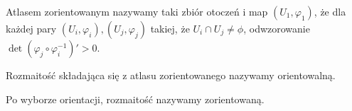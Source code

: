 \documentclass[../main.tex]{subfiles}
\begin{document}
\begin{definicja}
    Atlasem zorientowanym nazywamy taki zbiór otoczeń i map $(U_1, \varphi_1)$, że dla każdej pary $(U_i, \varphi_i), (U_j, \varphi_j)$ takiej, że $U_i\cap U_j \neq \phi$, odwzorowanie $\det\left( \varphi_j \circ \varphi_i^{-1} \right)' > 0$.
\end{definicja}
\begin{definicja}
    Rozmaitość składająca się z atlasu zorientowanego nazywamy orientowalną.
\end{definicja}
\begin{definicja}
    Po wyborze orientacji, rozmaitość nazywamy zorientowaną.
\end{definicja}
\end{document}
